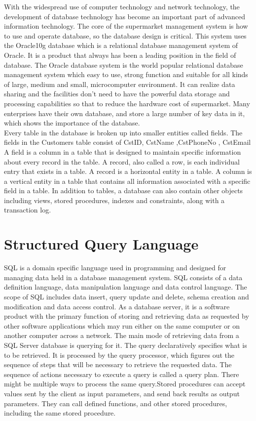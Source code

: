 \documentclass[12pt,a4paper]{report}
\begin{document}
With the widespread use of computer technology and network technology, the development of database technology has become an important part of advanced information technology. The core of the supermarket management system is how to use and operate database, so the database design is critical. This system uses the Oracle10g database which is a relational database management system of Oracle. It is a product that always has been a leading position in the field of database. The Oracle database system is the world popular relational database management system which easy to use, strong function and suitable for all kinds of large, medium and small, microcomputer environment. It can realize data sharing and the facilities don't need to have the powerful data storage and processing capabilities so that to reduce the hardware cost of supermarket. Many enterprises have their own database, and store a large number of key data in it, which shows the importance of the database.\\
Every table in the database is broken up into smaller entities called fields. The fields in the Customers table consist of CstID, CstName ,CstPhoneNo ,  CstEmail A field is a column in a table that is designed to maintain specific information about every record in the table. A record, also called a row, is each individual entry that exists in a table. A record is a horizontal entity in a table. A column is a vertical entity in a table that contains all information associated with a specific field in a table. In addition to tables, a database can also contain other objects including views, stored procedures, indexes and constraints, along with a transaction log.


\section{Structured Query Language}

SQL is a domain specific language used in programming  and designed for managing data held in a database management system. SQL consists of a data definition language, data manipulation language and data control language. The scope of SQL includes data insert, query update and delete, schema creation and modification and data access control. As a database server, it is a software product with the primary function of storing and retrieving data as requested by other software applications which may run either on the same computer or on another computer across a network.
The main mode of retrieving data from a SQL Server database is querying for it. The query declaratively specifies what is to be retrieved. It is processed by the query processor, which figures out the sequence of steps that will be necessary to retrieve the requested data. The sequence of actions necessary to execute a query is called a query plan. There might be multiple ways to process the same query.Stored procedures can accept values sent by the client as input parameters, and send back results as output parameters. They can call defined functions, and other stored procedures, including the same stored procedure.
\end{document}
